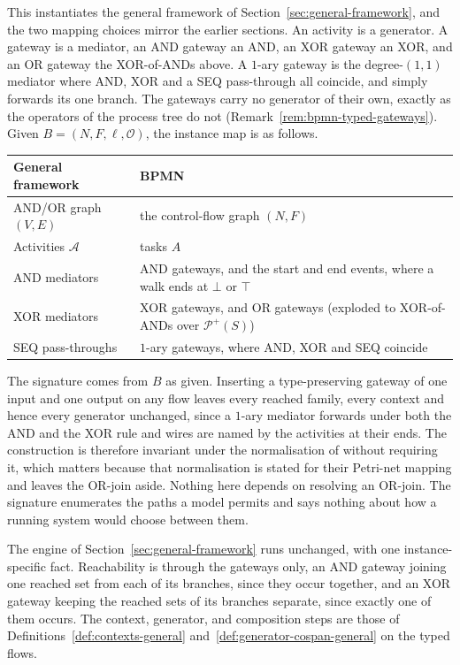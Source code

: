 This instantiates the general framework of Section~\ref{sec:general-framework}, and the two mapping
choices mirror the earlier sections. An activity is a generator. A gateway is a mediator, an AND
gateway an AND, an XOR gateway an XOR, and an OR gateway the XOR-of-ANDs above. A $1$-ary gateway is
the degree-$(1,1)$ mediator where AND, XOR and a SEQ pass-through all coincide, and simply forwards
its one branch. The gateways carry no generator of their own, exactly as the operators of the
process tree do not (Remark~\ref{rem:bpmn-typed-gateways}). Given
$B=(N,F,\ell,\mathcal{O})$, the instance map is as follows.
\medskip
\begin{center}
  \small\begin{tabularx}{\linewidth}{@{}lX@{}}
    \hline
    General framework & BPMN \\
    \hline
    AND/OR graph $(V,E)$ & the control-flow graph $(N,F)$ \\
    Activities $\mathcal{A}$ & tasks $A$ \\
    AND mediators & AND gateways, and the start and end events, where a walk ends at $\bot$ or $\top$ \\
    XOR mediators & XOR gateways, and OR gateways (exploded to XOR-of-ANDs over $\mathcal{P}^+(S)$) \\
    SEQ pass-throughs & $1$-ary gateways, where AND, XOR and SEQ coincide \\
    \hline
  \end{tabularx}
\end{center}
\medskip
The signature comes from $B$ as given. Inserting a type-preserving gateway of one input and one
output on any flow leaves every reached family, every context and hence every generator unchanged,
since a $1$-ary mediator forwards under both the AND and the XOR rule and wires are named by the
activities at their ends. The construction is therefore invariant under the normalisation of
\citet{dijkmanSemanticsAnalysisBusiness2008} without requiring it, which
matters because that normalisation is stated for their Petri-net mapping and leaves the OR-join
aside. Nothing here depends on resolving an OR-join. The signature enumerates the paths a model
permits and says nothing about how a running system would choose between them.

The engine of Section~\ref{sec:general-framework} runs unchanged, with one instance-specific
fact. Reachability is through the gateways only, an AND gateway joining one reached set from each
of its branches, since they occur together, and an XOR gateway keeping the reached sets of its
branches separate, since exactly one of them occurs. The context, generator, and composition steps
are those of Definitions~\ref{def:contexts-general} and~\ref{def:generator-cospan-general} on the
typed flows.

